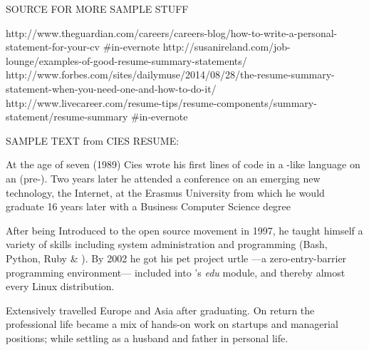 SOURCE FOR MORE SAMPLE STUFF

http://www.theguardian.com/careers/careers-blog/how-to-write-a-personal-statement-for-your-cv #in-evernote
http://susanireland.com/job-lounge/examples-of-good-resume-summary-statements/
http://www.forbes.com/sites/dailymuse/2014/08/28/the-resume-summary-statement-when-you-need-one-and-how-to-do-it/
http://www.livecareer.com/resume-tips/resume-components/summary-statement/resume-summary #in-evernote

SAMPLE TEXT from CIES RESUME:

At the age of seven (1989) Cies wrote his first lines of code in a -like language on an  (pre-).  Two years later he attended a conference on an emerging new technology, the Internet, at the Erasmus University from which he would graduate 16 years later with a Business Computer Science degree

After being Introduced to the open source movement in 1997, he taught himself a variety of skills including system administration and programming (Bash, Python, Ruby \& \CPP).  By 2002 he got his pet project urtle ---a zero-entry-barrier programming environment--- included into 's \emph{edu} module, and thereby almost every Linux distribution.

Extensively travelled Europe and Asia after graduating. On return the professional life became a mix of hands-on work on startups and managerial positions; while settling as a husband and father in personal life.


